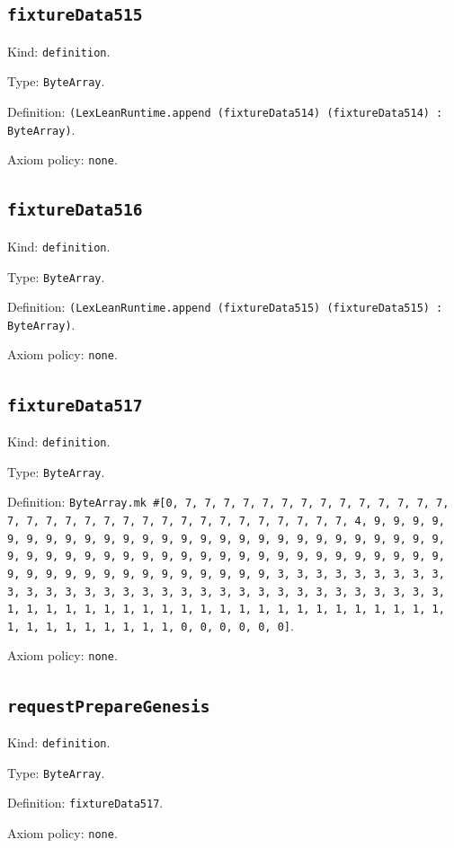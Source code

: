 \documentclass[11pt]{article}
\begin{document}
\subsection*{\texttt{fixtureData515}}
\noindent Kind: \texttt{definition}.\par
\noindent Type: \texttt{ByteArray}.\par
\noindent Definition: \texttt{(LexLeanRuntime.append (fixtureData514) (fixtureData514) : ByteArray)}.\par
\noindent Axiom policy: \texttt{none}.\par
\subsection*{\texttt{fixtureData516}}
\noindent Kind: \texttt{definition}.\par
\noindent Type: \texttt{ByteArray}.\par
\noindent Definition: \texttt{(LexLeanRuntime.append (fixtureData515) (fixtureData515) : ByteArray)}.\par
\noindent Axiom policy: \texttt{none}.\par
\subsection*{\texttt{fixtureData517}}
\noindent Kind: \texttt{definition}.\par
\noindent Type: \texttt{ByteArray}.\par
\noindent Definition: \texttt{ByteArray.mk \#[0, 7, 7, 7, 7, 7, 7, 7, 7, 7, 7, 7, 7, 7, 7, 7, 7, 7, 7, 7, 7, 7, 7, 7, 7, 7, 7, 7, 7, 7, 7, 7, 7, 4, 9, 9, 9, 9, 9, 9, 9, 9, 9, 9, 9, 9, 9, 9, 9, 9, 9, 9, 9, 9, 9, 9, 9, 9, 9, 9, 9, 9, 9, 9, 9, 9, 9, 9, 9, 9, 9, 9, 9, 9, 9, 9, 9, 9, 9, 9, 9, 9, 9, 9, 9, 9, 9, 9, 9, 9, 9, 9, 9, 9, 9, 9, 9, 9, 3, 3, 3, 3, 3, 3, 3, 3, 3, 3, 3, 3, 3, 3, 3, 3, 3, 3, 3, 3, 3, 3, 3, 3, 3, 3, 3, 3, 3, 3, 3, 3, 1, 1, 1, 1, 1, 1, 1, 1, 1, 1, 1, 1, 1, 1, 1, 1, 1, 1, 1, 1, 1, 1, 1, 1, 1, 1, 1, 1, 1, 1, 1, 1, 0, 0, 0, 0, 0, 0]}.\par
\noindent Axiom policy: \texttt{none}.\par
\subsection*{\texttt{requestPrepareGenesis}}
\noindent Kind: \texttt{definition}.\par
\noindent Type: \texttt{ByteArray}.\par
\noindent Definition: \texttt{fixtureData517}.\par
\noindent Axiom policy: \texttt{none}.\par
\end{document}
